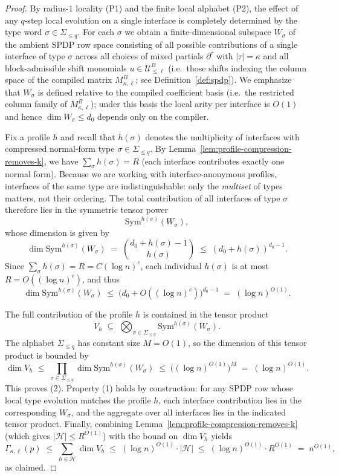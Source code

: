 \documentclass[12pt]{article}
\theoremstyle{definition}
\theoremstyle{definition}
\theoremstyle{remark}
\theoremstyle{remark}
\begin{document}
\begin{proof}
By radius-$1$ locality (P1) and the finite local alphabet
(P2), the effect of any $q$-step local evolution on a single
interface is completely determined by the type word
$\sigma \in \Sigma_{\le q}$. For each $\sigma$ we obtain a finite-dimensional
subspace $W_{\sigma}$ of the ambient SPDP row space consisting of all possible
contributions of a single interface of type $\sigma$ across all choices of
mixed partials $\partial^{\tau}$ with $|\tau| = \kappa$
and all block-admissible shift monomials $u\in\mathcal U^{B}_{\le \ell}$
(i.e.\ those shifts indexing the column space of the compiled matrix $M^{B}_{\kappa,\ell}$;
see Definition~\ref{def:spdp}).
We emphasize that $W_\sigma$ is defined relative to the compiled coefficient basis
(i.e.\ the restricted column family of $M^{B}_{\kappa,\ell}$); under this basis the local
arity per interface is $O(1)$ and hence $\dim W_\sigma \le d_0$ depends only on the compiler.

Fix a profile $h$ and recall that $h(\sigma)$ denotes the multiplicity
of interfaces with compressed normal-form type $\sigma\in\Sigma_{\le q}$.
By Lemma~\ref{lem:profile-compression-removes-k}, we have
$\sum_{\sigma} h(\sigma) = R$ (each interface contributes exactly one normal form).
Because we are working with interface-anonymous profiles, interfaces of the same
type are indistinguishable: only the \emph{multiset} of types matters, not their
ordering. The total contribution of all interfaces of type $\sigma$ therefore
lies in the symmetric tensor power
\[
  \mathrm{Sym}^{h(\sigma)}(W_{\sigma}),
\]
whose dimension is given by
\[
  \dim \mathrm{Sym}^{h(\sigma)}(W_{\sigma})
  \;=\; \binom{d_0 + h(\sigma) - 1}{h(\sigma)}
  \;\le\; (d_0 + h(\sigma))^{d_0 - 1}.
\]
Since $\sum_{\sigma} h(\sigma) = R = C(\log n)^c$, each individual
$h(\sigma)$ is at most $R = O((\log n)^{c})$, and thus
\[
  \dim \mathrm{Sym}^{h(\sigma)}(W_{\sigma})
  \;\le\; \bigl( d_0 + O((\log n)^{c}) \bigr)^{d_0-1}
  \;=\; (\log n)^{O(1)}.
\]

The full contribution of the profile $h$ is contained in the tensor
product
\[
  V_{h} \;\subseteq\; \bigotimes_{\sigma \in \Sigma_{\le q}}
  \mathrm{Sym}^{h(\sigma)}(W_{\sigma}).
\]
The alphabet $\Sigma_{\le q}$ has constant size $M = O(1)$, so the dimension of
this tensor product is bounded by
\[
  \dim V_{h}
  \;\le\; \prod_{\sigma \in \Sigma_{\le q}}
  \dim \mathrm{Sym}^{h(\sigma)}(W_{\sigma})
  \;\le\; \bigl( (\log n)^{O(1)} \bigr)^M
  \;=\; (\log n)^{O(1)}.
\]
This proves (2). Property (1) holds by construction: for any SPDP row whose
local type evolution matches the profile $h$, each interface
contribution lies in the corresponding $W_{\sigma}$, and the aggregate over
all interfaces lies in the indicated tensor product. Finally, combining
Lemma~\ref{lem:profile-compression-removes-k} (which gives
$|\mathcal{H}| \le R^{O(1)}$) with the bound on $\dim V_{h}$ yields
\[
  \Gamma_{\kappa,\ell}(p) \;\le\; \sum_{h \in \mathcal{H}} \dim V_{h}
  \;\le\; (\log n)^{O(1)} \cdot |\mathcal{H}|
  \;\le\; (\log n)^{O(1)} \cdot R^{O(1)}
  \;=\; n^{O(1)},
\]
as claimed.
\end{proof}
\end{document}
